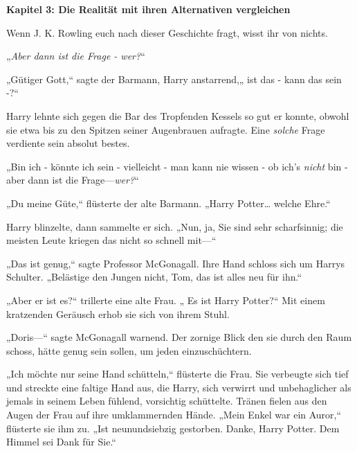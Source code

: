 

\hypertarget{die-realituxe4t-mit-ihren-alternativen-vergleichen}{%

\textbf{Kapitel 3: Die Realität mit ihren Alternativen vergleichen}

Wenn J. K. Rowling euch nach dieser Geschichte fragt, wisst ihr von nichts.

\later

„\emph{Aber dann ist die Frage - wer?}“

\later

„Gütiger Gott,“ sagte der Barmann, Harry anstarrend,„ ist das - kann das sein -?“

Harry lehnte sich gegen die Bar des Tropfenden Kessels so gut er konnte, obwohl sie etwa bis zu den Spitzen seiner Augenbrauen aufragte. Eine \emph{solche} Frage verdiente sein absolut bestes.

„Bin ich - könnte ich sein - vielleicht - man kann nie wissen - ob ich's \emph{nicht} bin - aber dann ist die Frage—\emph{wer?}“

„Du meine Güte,“ flüsterte der alte Barmann. „Harry Potter… welche Ehre.“

Harry blinzelte, dann sammelte er sich. „Nun, ja, Sie sind sehr scharfsinnig; die meisten Leute kriegen das nicht so schnell mit—“

„Das ist genug,“ sagte Professor McGonagall. Ihre Hand schloss sich um Harrys Schulter. „Belästige den Jungen nicht, Tom, das ist alles neu für ihn.“

„Aber er ist es?“ trillerte eine alte Frau. „ Es ist Harry Potter?“ Mit einem kratzenden Geräusch erhob sie sich von ihrem Stuhl.

„Doris—“ sagte McGonagall warnend. Der zornige Blick den sie durch den Raum schoss, hätte genug sein sollen, um jeden einzuschüchtern.

„Ich möchte nur seine Hand schütteln,“ flüsterte die Frau. Sie verbeugte sich tief und streckte eine faltige Hand aus, die Harry, sich verwirrt und unbehaglicher als jemals in seinem Leben fühlend, vorsichtig schüttelte. Tränen fielen aus den Augen der Frau auf ihre umklammernden Hände. „Mein Enkel war ein Auror,“ flüsterte sie ihm zu. „Ist neunundsiebzig gestorben. Danke, Harry Potter. Dem Himmel sei Dank für Sie.“

}
